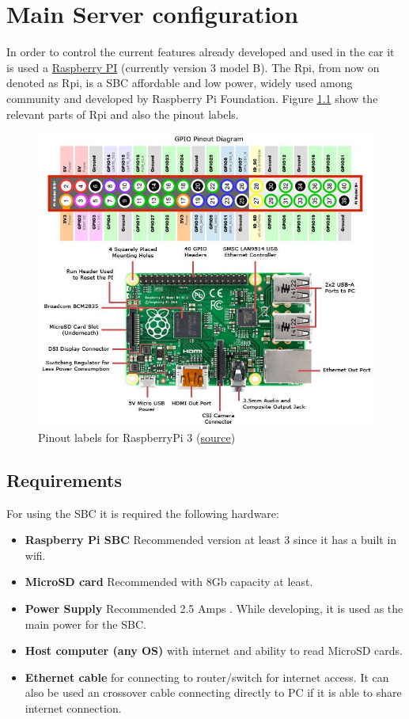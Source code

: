 \chapter{Main Server configuration}
\label{chapter:server}

In order to control the current features already developed and used in the car it is used a \href{https://www.raspberrypi.org/products/}{Raspberry PI} (currently version 3 model B). The \acrlong{Rpi}, from now on denoted as \acrshort{Rpi}, is a \gls{SBC} affordable and low power, widely used among community and developed by Raspberry Pi Foundation. Figure \ref{fig:raspberrypi_pinout} show the relevant parts of \gls{Rpi} and also the pinout labels.

\begin{figure}[h]
	\centering
	\includegraphics[width=0.9\linewidth]{figures/raspberry_pi_circuit_note_fig2}
	\caption[Pinout labels for RaspberryPi 3]{Pinout labels for RaspberryPi 3 (\href{https://www.jameco.com/Jameco/workshop/circuitnotes/raspberry-pi-circuit-note.html}{source})}
	\label{fig:raspberrypi_pinout}
\end{figure}

\section{Requirements}
For using the \gls{SBC} it is required the following hardware:
\begin{itemize}
	\tightlist
	\item \textbf{Raspberry Pi \gls{SBC}} Recommended version at least 3 since it has a built in wifi.
	\item \textbf{MicroSD card} Recommended with 8Gb capacity at least.
	\item \textbf{Power Supply} Recommended 2.5 Amps . While developing, it is used as the main power for the \gls{SBC}.
	\item \textbf{Host computer (any \gls{OS})} with internet and ability to read MicroSD cards.
	\item \textbf{Ethernet cable} for connecting to router/switch for internet access. It can also be used an crossover cable connecting directly to PC if it is able to share internet connection.
\end{itemize}

